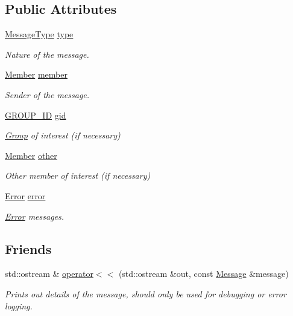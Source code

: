 \subsection*{Public Attributes}
\begin{DoxyCompactItemize}
\item 
\hyperlink{namespaceshaan97_1_1sync_a902024d98481afc28794167b4524f537}{Message\+Type} \hyperlink{structshaan97_1_1sync_1_1_message_a690d35bec280963fc0a20d71dcd53b46}{type}
\begin{DoxyCompactList}\small\item\em Nature of the message. \end{DoxyCompactList}\item 
\hyperlink{classshaan97_1_1sync_1_1_member}{Member} \hyperlink{structshaan97_1_1sync_1_1_message_a7abc98c88212d6ad6b0f613957489ad3}{member}
\begin{DoxyCompactList}\small\item\em Sender of the message. \end{DoxyCompactList}\item 
\hyperlink{namespaceshaan97_1_1sync_a34cebf175d27dfc3d82f24608f7043c1}{G\+R\+O\+U\+P\+\_\+\+ID} \hyperlink{structshaan97_1_1sync_1_1_message_a43e7dbbfb505261b1d9432ecafbc8699}{gid}
\begin{DoxyCompactList}\small\item\em \hyperlink{classshaan97_1_1sync_1_1_group}{Group} of interest (if necessary) \end{DoxyCompactList}\item 
\hyperlink{classshaan97_1_1sync_1_1_member}{Member} \hyperlink{structshaan97_1_1sync_1_1_message_a1b27154c48628e01d12d4290244c4918}{other}
\begin{DoxyCompactList}\small\item\em Other member of interest (if necessary) \end{DoxyCompactList}\item 
\hyperlink{classshaan97_1_1sync_1_1_error}{Error} \hyperlink{structshaan97_1_1sync_1_1_message_a92f154226ebe0ff83eaec8885927c605}{error}
\begin{DoxyCompactList}\small\item\em \hyperlink{classshaan97_1_1sync_1_1_error}{Error} messages. \end{DoxyCompactList}\end{DoxyCompactItemize}
\subsection*{Friends}
\begin{DoxyCompactItemize}
\item 
std\+::ostream \& \hyperlink{structshaan97_1_1sync_1_1_message_abb79787d78c9a91699bd7841005df5f7}{operator$<$$<$} (std\+::ostream \&out, const \hyperlink{structshaan97_1_1sync_1_1_message}{Message} \&message)
\begin{DoxyCompactList}\small\item\em Prints out details of the message, should only be used for debugging or error logging. \end{DoxyCompactList}\end{DoxyCompactItemize}


